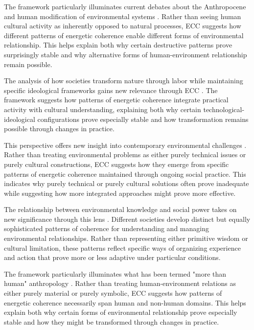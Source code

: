 \begin{refsection}
The framework particularly illuminates current debates about the Anthropocene and human modification of environmental systems \cite{tsing2015mushroom}. Rather than seeing human cultural activity as inherently opposed to natural processes, ECC suggests how different patterns of energetic coherence enable different forms of environmental relationship. This helps explain both why certain destructive patterns prove surprisingly stable and why alternative forms of human-environment relationship remain possible.

The analysis of how societies transform nature through labor while maintaining specific ideological frameworks gains new relevance through ECC \cite{latour1993modern}. The framework suggests how patterns of energetic coherence integrate practical activity with cultural understanding, explaining both why certain technological-ideological configurations prove especially stable and how transformation remains possible through changes in practice.

This perspective offers new insight into contemporary environmental challenges \cite{tsing2015mushroom}. Rather than treating environmental problems as either purely technical issues or purely cultural constructions, ECC suggests how they emerge from specific patterns of energetic coherence maintained through ongoing social practice. This indicates why purely technical or purely cultural solutions often prove inadequate while suggesting how more integrated approaches might prove more effective.

The relationship between environmental knowledge and social power takes on new significance through this lens \cite{palsson2015nature}. Different societies develop distinct but equally sophisticated patterns of coherence for understanding and managing environmental relationships. Rather than representing either primitive wisdom or cultural limitation, these patterns reflect specific ways of organizing experience and action that prove more or less adaptive under particular conditions.

The framework particularly illuminates what has been termed "more than human" anthropology \cite{kohn2013forests}. Rather than treating human-environment relations as either purely material or purely symbolic, ECC suggests how patterns of energetic coherence necessarily span human and non-human domains. This helps explain both why certain forms of environmental relationship prove especially stable and how they might be transformed through changes in practice.


\end{refsection}
